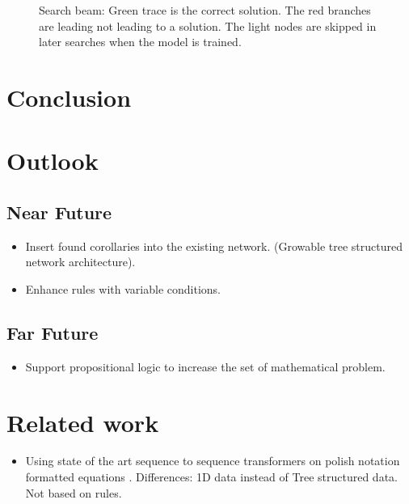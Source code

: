 \documentclass{scrartcl}
\begin{document}
\begin{figure}[!htbp]
	\centering
	
	\caption{Search beam: Green trace is the correct solution. The red branches are leading not leading to a solution. The light nodes are skipped in later searches when the model is trained.} \label{fig:M1}
\end{figure}

\section{Conclusion}

\section{Outlook}
\subsection{Near Future}
\begin{itemize}
	\item Insert found corollaries into the existing network. (Growable tree structured network architecture). \cite{graves2016hybrid}
	\item Enhance rules with variable conditions.
\end{itemize}

\subsection{Far Future}
\begin{itemize}
	\item Support propositional logic to increase the set of mathematical problem.
\end{itemize}

\section{Related work}

\begin{itemize}
	\item Using state of the art sequence to sequence transformers on polish notation formatted equations \cite{Lample2020Deep}. Differences: 1D data instead of Tree structured data. Not based on rules. 
\end{itemize}

\printbibliography
\end{document}
